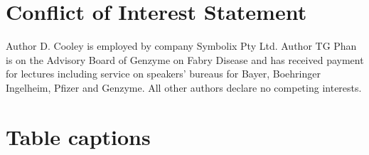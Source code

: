 \documentclass[utf8]{frontiersHLTH}
\begin{document}
\section*{Conflict of Interest Statement}
Author D. Cooley is employed by company Symbolix Pty Ltd. Author TG
Phan is on the Advisory Board of Genzyme on Fabry Disease and has
received payment for lectures including service on speakers’ bureaus
for Bayer, Boehringer Ingelheim, Pfizer and Genzyme. All other authors
declare no competing interests.

 

\section*{Table captions}
\end{document}
